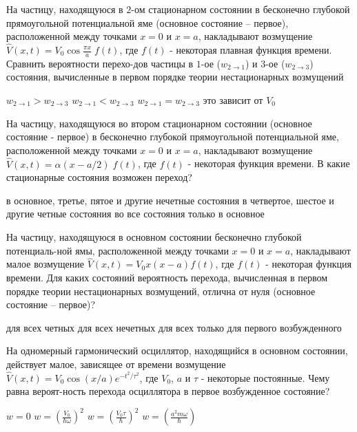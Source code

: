 \documentclass[11pt,a4paper]{exam}
\begin{document}
\begin{questions}
\question На частицу, находящуюся в $2$-ом стационарном состоянии в бесконечно глубокой прямоугольной потенциальной яме (основное состояние – первое), расположенной между точками $x = 0$ и $x = a$, накладывают возмущение $\hat V(x,t) = {V_0}\cos \frac{{\pi x}}{a}\;f(t)$, где $f(t)$ - некоторая плавная функция времени. Сравнить вероятности перехо-дов частицы в $1$-ое (${w_{2 \to 1}}$) и $3$-ое (${w_{2 \to 3}}$) состояния, вычисленные в первом порядке теории нестационарных возмущений
\begin{choices}
\choice ${w_{2 \to 1}} > {w_{2 \to 3}}$  
\choice ${w_{2 \to 1}} < {w_{2 \to 3}}$     
\choice ${w_{2 \to 1}} = {w_{2 \to 3}}$  
\choice это зависит от ${V_0}$
\end{choices}

\question На частицу, находящуюся во втором стационарном состоянии (основное состояние - первое) в бесконечно глубокой прямоугольной потенциальной яме, расположенной между точками $x = 0$ и $x = a$, накладывают возмущение $\hat V(x,t) = \alpha (x - a/2)\;f(t)$, где $f(t)$ - некоторая функция времени. В какие стационарные состояния возможен переход? 
\begin{choices}
\choice в основное, третье, пятое и другие нечетные состояния
\choice в четвертое, шестое и другие четные состояния
\choice во все состояния
\choice только в основное
\end{choices}

\question На частицу, находящуюся в основном состоянии бесконечно глубокой потенциаль-ной ямы, расположенной между точками $x = 0$ и $x = a$, накладывают малое возмущение $\hat V(x,t) = {V_0}x(x - a)f(t)$, где $f(t)$ - некоторая функция времени. Для каких состояний вероятность перехода, вычисленная в первом порядке теории нестационарных возмущений, отлична от нуля (основное состояние – первое)?
\begin{choices}
\choice для всех четных         
\choice для всех нечетных
\choice для всех          
\choice только для первого возбужденного
\end{choices}

\question  На одномерный гармонический осциллятор, находящийся в основном состоянии, действует малое, зависящее от времени возмущение $\hat V(x,t) = {V_0}\cos (x/a){e^{ - {t^2}/{\tau ^2}}}$, где ${V_0}$, $a$ и $\tau $ - некоторые постоянные. Чему равна вероят-ность перехода осциллятора в первое возбужденное состояние? 
\begin{choices}
\choice $w = 0$  
\choice $w = {\left( {\frac{{{V_0}}}{{\hbar \omega }}} \right)^2}$     
\choice $w = {\left( {\frac{{{V_0}\tau }}{\hbar }} \right)^2}$      
\choice $w = \left( {\frac{{{a^2}m\omega }}{\hbar }} \right)$
\end{choices}


\end{questions}
\end{document}

